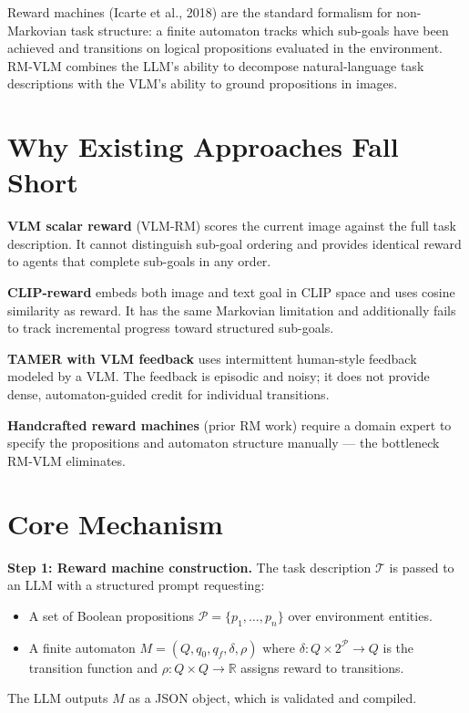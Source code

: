 \documentclass[10pt,twocolumn]{article}
\begin{document}
Reward machines (Icarte et al., 2018) are the standard formalism for
non-Markovian task structure: a finite automaton tracks which sub-goals
have been achieved and transitions on logical propositions evaluated in
the environment. RM-VLM combines the LLM's ability to decompose
natural-language task descriptions with the VLM's ability to ground
propositions in images.

\section{Why Existing Approaches Fall Short}

\textbf{VLM scalar reward} (VLM-RM) scores the current image against
the full task description. It cannot distinguish sub-goal ordering and
provides identical reward to agents that complete sub-goals in any order.

\textbf{CLIP-reward} embeds both image and text goal in CLIP space and
uses cosine similarity as reward. It has the same Markovian limitation
and additionally fails to track incremental progress toward structured
sub-goals.

\textbf{TAMER with VLM feedback} uses intermittent human-style feedback
modeled by a VLM. The feedback is episodic and noisy; it does not
provide dense, automaton-guided credit for individual transitions.

\textbf{Handcrafted reward machines} (prior RM work) require a domain
expert to specify the propositions and automaton structure manually ---
the bottleneck RM-VLM eliminates.

\section{Core Mechanism}

\textbf{Step 1: Reward machine construction.}
The task description $\mathcal{T}$ is passed to an LLM with a
structured prompt requesting:
\begin{itemize}[itemsep=2pt,parsep=0pt]
  \item A set of Boolean propositions $\mathcal{P} = \{p_1, \ldots,
    p_n\}$ over environment entities.
  \item A finite automaton
    $M = (Q, q_0, q_f, \delta, \rho)$ where
    $\delta: Q \times 2^\mathcal{P} \to Q$ is the transition function
    and $\rho: Q \times Q \to \mathbb{R}$ assigns reward to transitions.
\end{itemize}
The LLM outputs $M$ as a JSON object, which is validated and compiled.
\end{document}
